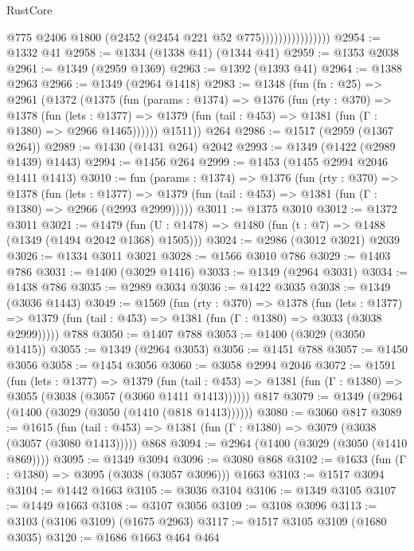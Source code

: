 \begin{lexlean}{RustCore}
\begin{coremodule}
                                @775
                                @2406
                                @1800
                                (@2452 (@2454 @221 @52 @775))))))))))))))))
@2954 := @1332 @41
@2958 := @1334 (@1338 @41) (@1344 @41)
@2959 := @1353 @2038
@2961 := @1349 (@2959 @1369)
@2963 := @1392 (@1393 @41)
@2964 := @1388 @2963
@2966 := @1349 (@2964 @1418)
@2983 := @1348
    (fun (fn : @25) =>
    @2961
      (@1372
        (@1375
          (fun (params : @1374) =>
          @1376
            (fun (rty : @370) =>
            @1378
              (fun (lets : @1377) =>
              @1379 (fun (tail : @453) => @1381 (fun (Γ : @1380) => @2966 @1465))))))
        @1511))
    @264
@2986 := @1517 (@2959 (@1367 @264))
@2989 := @1430 (@1431 @264) @2042
@2993 := @1349 (@1422 (@2989 @1439) @1443)
@2994 := @1456 @264
@2999 := @1453 (@1455 @2994 @2046 @1411 @1413)
@3010 := fun (params : @1374) =>
  @1376
    (fun (rty : @370) =>
    @1378
      (fun (lets : @1377) =>
      @1379 (fun (tail : @453) => @1381 (fun (Γ : @1380) => @2966 (@2993 @2999)))))
@3011 := @1375 @3010
@3012 := @1372 @3011
@3021 := @1479 (fun (U : @1478) => @1480 (fun (t : @7) => @1488 (@1349 (@1494 @2042 @1368) @1505)))
@3024 := @2986 (@3012 @3021) @2039
@3026 := @1334 @3011 @3021
@3028 := @1566 @3010 @786
@3029 := @1403 @786
@3031 := @1400 (@3029 @1416)
@3033 := @1349 (@2964 @3031)
@3034 := @1438 @786
@3035 := @2989 @3034
@3036 := @1422 @3035
@3038 := @1349 (@3036 @1443)
@3049 := @1569
    (fun (rty : @370) =>
    @1378
      (fun (lets : @1377) =>
      @1379 (fun (tail : @453) => @1381 (fun (Γ : @1380) => @3033 (@3038 @2999)))))
    @788
@3050 := @1407 @788
@3053 := @1400 (@3029 (@3050 @1415))
@3055 := @1349 (@2964 @3053)
@3056 := @1451 @788
@3057 := @1450 @3056
@3058 := @1454 @3056
@3060 := @3058 @2994 @2046
@3072 := @1591
    (fun (lets : @1377) =>
    @1379
      (fun (tail : @453) => @1381 (fun (Γ : @1380) => @3055 (@3038 (@3057 (@3060 @1411 @1413))))))
    @817
@3079 := @1349 (@2964 (@1400 (@3029 (@3050 (@1410 (@818 @1413))))))
@3080 := @3060 @817
@3089 := @1615
    (fun (tail : @453) => @1381 (fun (Γ : @1380) => @3079 (@3038 (@3057 (@3080 @1413)))))
    @868
@3094 := @2964 (@1400 (@3029 (@3050 (@1410 @869))))
@3095 := @1349 @3094
@3096 := @3080 @868
@3102 := @1633 (fun (Γ : @1380) => @3095 (@3038 (@3057 @3096))) @1663
@3103 := @1517 @3094
@3104 := @1442 @1663
@3105 := @3036 @3104
@3106 := @1349 @3105
@3107 := @1449 @1663
@3108 := @3107 @3056
@3109 := @3108 @3096
@3113 := @3103 (@3106 @3109) (@1675 @2963)
@3117 := @1517 @3105 @3109 (@1680 @3035)
@3120 := @1686 @1663 @464 @464

\end{coremodule}
\end{lexlean}

